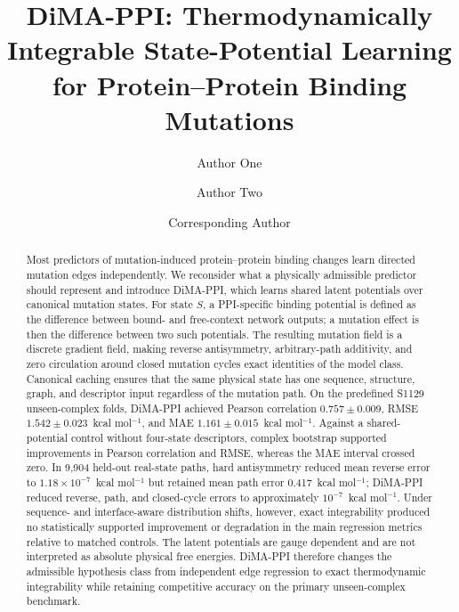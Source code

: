 \documentclass[preprint,12pt]{elsarticle}
\begin{document}
\begin{frontmatter}

\title{DiMA-PPI: Thermodynamically Integrable State-Potential Learning for Protein--Protein Binding Mutations}

\author[aff1]{Author One}
\author[aff1]{Author Two}
\author[aff1]{Corresponding Author}

\begin{abstract}
Most predictors of mutation-induced protein--protein binding changes learn directed mutation edges independently. We reconsider what a physically admissible predictor should represent and introduce DiMA-PPI, which learns shared latent potentials over canonical mutation states. For state $S$, a PPI-specific binding potential is defined as the difference between bound- and free-context network outputs; a mutation effect is then the difference between two such potentials. The resulting mutation field is a discrete gradient field, making reverse antisymmetry, arbitrary-path additivity, and zero circulation around closed mutation cycles exact identities of the model class. Canonical caching ensures that the same physical state has one sequence, structure, graph, and descriptor input regardless of the mutation path. On the predefined S1129 unseen-complex folds, DiMA-PPI achieved Pearson correlation $0.757\pm0.009$, RMSE $1.542\pm0.023$~kcal mol$^{-1}$, and MAE $1.161\pm0.015$~kcal mol$^{-1}$. Against a shared-potential control without four-state descriptors, complex bootstrap supported improvements in Pearson correlation and RMSE, whereas the MAE interval crossed zero. In 9,904 held-out real-state paths, hard antisymmetry reduced mean reverse error to $1.18\times10^{-7}$~kcal mol$^{-1}$ but retained mean path error 0.417~kcal mol$^{-1}$; DiMA-PPI reduced reverse, path, and closed-cycle errors to approximately $10^{-7}$~kcal mol$^{-1}$. Under sequence- and interface-aware distribution shifts, however, exact integrability produced no statistically supported improvement or degradation in the main regression metrics relative to matched controls. The latent potentials are gauge dependent and are not interpreted as absolute physical free energies. DiMA-PPI therefore changes the admissible hypothesis class from independent edge regression to exact thermodynamic integrability while retaining competitive accuracy on the primary unseen-complex benchmark.
\end{abstract}


\end{frontmatter}
\end{document}
